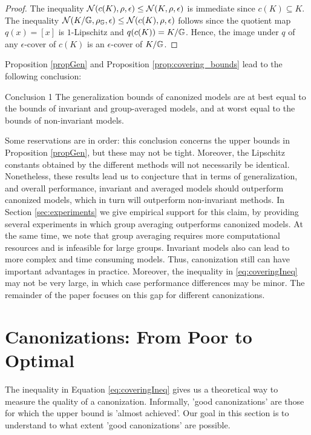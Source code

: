 \begin{proof}
The inequality $\mathcal{N}(c(K),\rho,\epsilon)\leq \mathcal{N}(K,\rho,\epsilon)$ is immediate since $c(K)\subseteq K$.
The inequality $\mathcal{N}(K/\mathbb{G},\rho_{\mathbb{G}},\epsilon)\leq \mathcal{N}(c(K),\rho,\epsilon)$ follows since the quotient map $q(x)=[x]$ is $1$-Lipschitz and $q(c(K))=K/\mathbb{G}$. Hence, the image under $q$ of any $\epsilon$-cover of $c(K)$ is an $\epsilon$-cover of $K/\mathbb{G}$.

\end{proof}
Proposition \ref{propGen} and Proposition \ref{prop:covering_bounds} lead to the following conclusion:
\begin{conclusionbox}{Conclusion 1}
The generalization bounds of canonized models are at best equal to the bounds of invariant and group-averaged models, and at worst equal to the bounds of non-invariant models.
\end{conclusionbox}
Some reservations are in order: this conclusion concerns the upper bounds in Proposition \ref{propGen}, but these may not be tight. Moreover, the Lipschitz constants obtained by the different methods will not necessarily be identical. Nonetheless, these results lead us to conjecture that in terms of generalization, and overall performance, invariant and averaged models should outperform canonized models, which in turn will outperform non-invariant methods. In Section \ref{sec:experiments} we give empirical support for this claim, by providing several experiments in which group averaging outperforms canonized models. At the same time, we note that group averaging requires more computational resources and is infeasible for large groups. Invariant models also can lead to more complex and time consuming models. Thus, canonization still can have important advantages in practice. Moreover, the inequality in \eqref{eq:coveringIneq} may not be very large, in which case performance differences may be minor. The remainder of the paper focuses on this gap for different canonizations.

\section{Canonizations: From Poor to Optimal}\label{sec:evaluation}
The inequality in Equation \ref{eq:coveringIneq} gives us a theoretical way to measure the quality of a canonization. Informally, 'good canonizations' are those for which the upper bound is 'almost achieved'. Our goal in this section is to understand to what extent 'good canonizations' are possible. 

